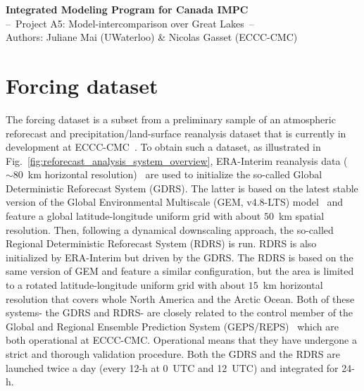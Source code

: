 \documentclass{article}
\begin{document}
	
	\pagestyle{plain}
	
	\vspace*{-1.5cm}
	\begin{center}
		\textbf{\LARGE Integrated Modeling Program for Canada IMPC}\\[4pt]
		{\Large --~Project A5: Model-intercomparison over Great Lakes~--}\\[4pt]
		Authors: Juliane Mai (UWaterloo) \& Nicolas Gasset (ECCC-CMC)
	\end{center}

	\section{Forcing dataset}

	The forcing dataset is a subset from a preliminary sample of an atmospheric reforecast and precipitation/land-surface reanalysis dataset that is currently in development at ECCC-CMC~\citep{gasset2017c,gasset2018a}. 
	To obtain such a dataset, as illustrated in Fig.~\ref{fig:reforecast_analysis_system_overview}, ERA-Interim reanalysis data ($\sim 80$~km horizontal resolution)~\citep{dee2011} are used to initialize the so-called Global Deterministic Reforecast System (GDRS). The latter is based on the latest stable version of the Global Environmental Multiscale (GEM, v4.8-LTS) model~\citep{cote1998,cote1998a,girard2013} and feature a global latitude-longitude uniform grid with about $50$~km spatial resolution. 
	Then, following a dynamical downscaling approach, the so-called Regional Deterministic Reforecast System (RDRS) is run. RDRS is also initialized by ERA-Interim but driven by the GDRS. The RDRS is based on the same version of GEM and feature a similar configuration, but the area is limited to a rotated latitude-longitude uniform grid with about $15$~km horizontal resolution that covers whole North America and the Arctic Ocean. Both of these systems- the GDRS and RDRS-  are closely related to the control member of the Global and Regional Ensemble Prediction System (GEPS/REPS)~\citep{charron2009,lavaysse2012,houtekamer2013,gagnon2015,lin2016} which are both operational at ECCC-CMC. Operational means that they have undergone a strict and thorough validation procedure. Both the GDRS and the RDRS are launched twice a day (every 12-h at 0~UTC and 12~UTC) and integrated for 24-h. 
	
\end{document}
